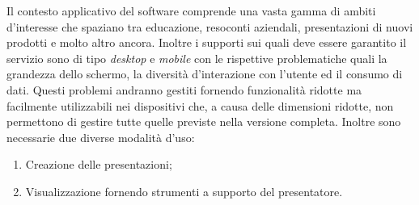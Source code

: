 Il contesto applicativo del software comprende una vasta gamma di ambiti d'interesse che spaziano tra educazione, resoconti aziendali, presentazioni di nuovi prodotti e molto altro ancora.
Inoltre i supporti sui quali deve essere garantito il servizio sono di tipo \textit{desktop} e \textit{mobile} con le rispettive problematiche quali la grandezza dello schermo, la diversità d'interazione con l'utente ed il consumo di dati. Questi problemi andranno gestiti fornendo funzionalità ridotte ma facilmente utilizzabili nei dispositivi che, a causa delle dimensioni ridotte, non permettono di gestire tutte quelle previste nella versione completa.
Inoltre sono necessarie due diverse modalità d'uso:
\begin{enumerate}
  \item Creazione delle presentazioni;
  \item Visualizzazione fornendo strumenti a supporto del presentatore.
\end{enumerate}

